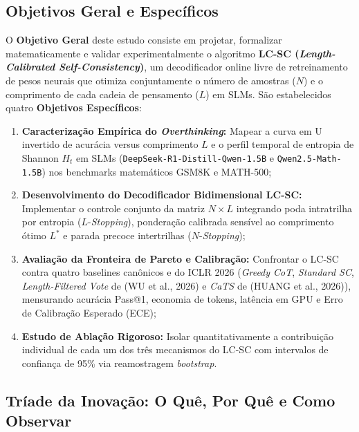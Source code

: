 \documentclass[9pt,conference]{IEEEtran}
\begin{document}
\subsection{Objetivos Geral e Espec\'{i}ficos}

O \textbf{Objetivo Geral} deste estudo consiste em projetar, formalizar matematicamente e validar experimentalmente o algoritmo \textbf{LC-SC (\textit{Length-Calibrated Self-Consistency})}, um decodificador online livre de retreinamento de pesos neurais que otimiza conjuntamente o n\'{u}mero de amostras ($N$) e o comprimento de cada cadeia de pensamento ($L$) em SLMs. S\~{a}o estabelecidos quatro \textbf{Objetivos Espec\'{i}ficos}:
\begin{enumerate}
    \item \textbf{Caracteriza\c{c}\~{a}o Emp\'{i}rica do \textit{Overthinking}:} Mapear a curva em U invertido de acur\'{a}cia versus comprimento $L$ e o perfil temporal de entropia de Shannon $H_t$ em SLMs (\texttt{DeepSeek-R1-Distill-Qwen-1.5B} e \texttt{Qwen2.5-Math-1.5B}) nos benchmarks matem\'{a}ticos GSM8K e MATH-500;
    \item \textbf{Desenvolvimento do Decodificador Bidimensional LC-SC:} Implementar o controle conjunto da matriz $N \times L$ integrando poda intratrilha por entropia ($L$-\textit{Stopping}), pondera\c{c}\~{a}o calibrada sens\'{i}vel ao comprimento \'{o}timo $L^*$ e parada precoce intertrilhas ($N$-\textit{Stopping});
    \item \textbf{Avalia\c{c}\~{a}o da Fronteira de Pareto e Calibra\c{c}\~{a}o:} Confrontar o LC-SC contra quatro baselines can\^{o}nicos e do ICLR 2026 (\textit{Greedy CoT}, \textit{Standard SC}, \textit{Length-Filtered Vote} de (WU et al., 2026) e \textit{CaTS} de (HUANG et al., 2026)), mensurando acur\'{a}cia Pass@1, economia de tokens, lat\^{e}ncia em GPU e Erro de Calibra\c{c}\~{a}o Esperado (ECE);
    \item \textbf{Estudo de Abla\c{c}\~{a}o Rigoroso:} Isolar quantitativamente a contribui\c{c}\~{a}o individual de cada um dos tr\^{e}s mecanismos do LC-SC com intervalos de confian\c{c}a de 95\% via reamostragem \textit{bootstrap}.
\end{enumerate}

\subsection{Tr\'{i}ade da Inova\c{c}\~{a}o: O Qu\^{e}, Por Qu\^{e} e Como Observar}
\end{document}
